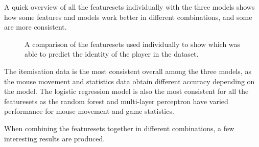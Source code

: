 \documentclass[Report.tex]{subfiles}
\newcommand{\newaxis}[7]{
\begin{axis}[
    ybar,
    title={\textbf{#1}},
    ymin=#3, ymax=#4,
    bar width=1em,
    width={#5},
    height={#6},
    legend style={at={#7},anchor=north,legend columns=-1},
    enlarge x limits=0.4,
    x tick label style={align=center,text width=2cm},
    symbolic x coords={Logistic Regression, Random Forest, Multi-layer Perceptron},
    xtick=data,
    ylabel={#2}
]
}
\newcommand{\plotbar}[3] {
\addplot+[
	discard if not={features}{#1},
] table [x=model, y=#2, col sep=comma] {data/15-game-cv.csv};
\addlegendentry{#3}
}
\begin{document}
A quick overview of all the featuresets individually with the three models shows how some features and models work better in different combinations, and some are more consistent. 

\begin{figure}[H]
\centering
{}
\caption{A comparison of the featuresets used individually to show which was able to predict the identity of the player in the dataset. }
\end{figure}

The itemisation data is the most consistent overall among the three models, as the mouse movement and statistics data obtain different accuracy depending on the model. The logistic regression model is also the most consistent for all the featuresets as the random forest and multi-layer perceptron have varied performance for mouse movement and game statistics. 


When combining the featuresets together in different combinations, a few interesting results are produced. 
\end{document}

